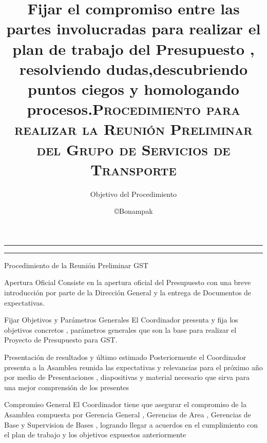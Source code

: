 \documentclass[12pt,letterpaper]{article}
\author{Objetivo del Procedimiento}
\title{Fijar el compromiso entre las partes involucradas para realizar el plan de trabajo del Presupuesto , resolviendo dudas,descubriendo puntos ciegos y homologando procesos.}
\makeatletter
\def\makecaratula{%
  \null
  \thispagestyle{empty}%
  
  
  \vskip 1cm
  \begin{flushright}
    \scshape\Large\@author
  \end{flushright}
  \vfil
  \hrule height 2pt
  \par
  \begin{center}
    \normalfont \strut \@title \par
  \end{center}
  \hrule height 2pt
  \par
  \vfil
  \vfil
  \null
  \cleardoublepage
  }
\makeatother
\begin{document}
\makecaratula
\newpage

 {\sffamily %
  \title{\scshape Procedimiento para realizar la Reuni\'on Preliminar del Grupo de Servicios de Transporte}
  \author{\copyright Bonampak}
  \maketitle

  \tableofcontents
    \listoffigures

  \newpage
  \begin{section}
  {\color{kblue} Procedimiento de la Reuni\'on Preliminar GST}
	
	\vspace{17mm}
    \begin{subsection}
    {\color{kgreen}Apertura Oficial }
	  Consiste en la apertura oficial del Presupuesto con una breve introducci\'on por parte de la Direcci\'on General y la entrega de Documentos de expectativas.
	  \\
    \end{subsection}

 
    \begin{subsection}
	{\color{kgreen}Fijar Objetivos y Par\'ametros Generales}
	  El Coordinador presenta y fija los objetivos concretos , par\'ametros generales que son la base para realizar el Proyecto de Presupuesto para GST.
    \end{subsection}
    
    \begin{subsection}
    {\color{kgreen}Presentaci\'on de resultados y \'ultimo estimado}
	  Posteriormente el Coordinador presenta a la Asamblea reunida las expectativas y relevancias para el pr\'oximo a\~no por medio de Presentaciones , diapositivas y material necesario que sirva para una mejor comprensi\'on de los presentes
	  \\
    \end{subsection}
    
    
    \begin{subsection}
    {\color{kgreen}Compromiso General}
El Coordinador tiene que asegurar el compromiso de la Asamblea compuesta por Gerencia General , Gerencias de Area , Gerencias de Base y Supervision de Bases , logrando llegar a acuerdos en el cumplimiento con el plan de trabajo y los objetivos expuestos anteriormente
	  \\
    \end{subsection}
    

\end{section}}
\end{document}
